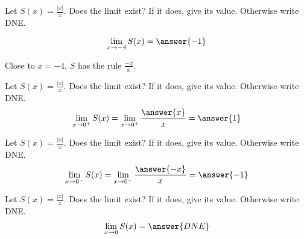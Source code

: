 \documentclass{ximera}
\author{Steven Gubkin\and Nela Lakos}
\begin{document}
\begin{exercise}

Let $S(x) = \frac{|x|}{x}$.  Does the limit exist?  If it
does, give its value.  Otherwise write DNE.



\[
\lim_{x \to -4} S(x) = \answer{-1}
\] 

\begin{hint}
  Close to $x=-4$, $S$ has the rule $\frac{-x}{x}$.
\end{hint}
\begin{exercise}
Let $S(x) = \frac{|x|}{x}$.  Does the limit exist?  If it
does, give its value.  Otherwise write DNE.
\[
\lim_{x \to 0^{+}} S(x) =\lim_{x \to 0^{+}} \frac{\answer{x}}{x} = \answer{1}
\] 
\begin{exercise}
Let $S(x) = \frac{|x|}{x}$.  Does the limit exist?  If it
does, give its value.  Otherwise write DNE.
\[
\lim_{x \to 0^{-}} S(x) =\lim_{x \to 0^{-}} \frac{\answer{-x}}{x} = \answer{-1}
\] 
\begin{exercise}
Let $S(x) = \frac{|x|}{x}$.  Does the limit exist?  If it
does, give its value.  Otherwise write DNE.
\[
\lim_{x \to 0} S(x) = \answer{DNE}
\] 
\end{exercise}
\end{exercise}
\end{exercise}
\end{exercise}
\end{document}
